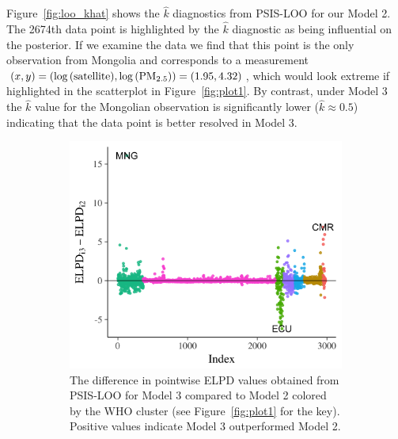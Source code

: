 \documentclass{statsoc}
\begin{document}
Figure~\ref{fig:loo_khat} shows the $\hat{k}$ diagnostics from PSIS-LOO for our
Model 2. The 2674th data point is highlighted by the $\hat{k}$ diagnostic as
being influential on the posterior. If we examine the data we find that this
point is the only observation from Mongolia and corresponds to a measurement
$(x,y) = (\log{(\rm satellite)}, \log{({\rm PM}_{2.5})}) = (1.95, 4.32)$,
which would look extreme if highlighted in the scatterplot in Figure~\ref{fig:plot1}. 
By contrast, under Model 3 the $\hat{k}$ value for the Mongolian observation 
is significantly lower ($\hat{k} \approx 0.5$) indicating that the data point is better 
resolved in Model 3.

\begin{figure}
\centering
\begin{subfigure}{0.48\textwidth}
\includegraphics[width=\textwidth]{loo_elpd_diff_23.png}
\caption{The difference in pointwise ELPD values obtained from PSIS-LOO for
Model 3 compared to Model 2 colored by the WHO cluster (see
Figure~\ref{fig:plot1} for the key). Positive values indicate Model 3
outperformed Model 2.}
\label{fig:loo_elpd_diff}
\end{subfigure}
~
\begin{subfigure}{0.48\textwidth}

\end{subfigure}
\end{figure}
\end{document}
